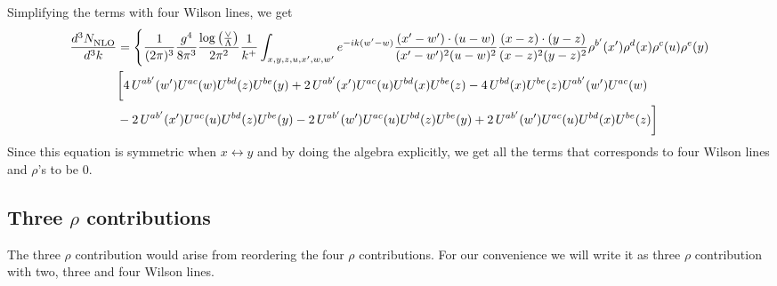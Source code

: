 \documentclass[aps,prd,amsmath,amssymb,nofootinbib]{revtex4-2}
\numberwithin{equation}{section}
\begin{document}
Simplifying the terms with four Wilson lines, we get
\begin{align}
       \frac{d^{3}N_{\rm NLO}^{\rm}}{d^{3}k}  & =  \Bigg\{\frac{1}{(2\pi)^{3}}\frac{g^{4}}{8\pi^{3}}\frac{\log{\left(\frac{\vee}{\Lambda}\right)}}{2\pi^{2}} \frac{1}{k^{+}}\int_{x,y,z,u,x^{\prime},w,w^{\prime}}e^{-ik(w^{\prime}-w)}\frac{(x^{\prime}-w^{\prime})\cdot (u-w)}{(x^{\prime}-w^{\prime})^{2} (u-w)^{2}} \frac{(x-z)\cdot (y-z)}{(x-z)^{2}(y-z)^{2}}\rho^{b'}(x') \rho^{d}(x) \rho^{c}(u) \rho^{e}(y)\notag \\ & \bigg[4\,U^{ab'}(w')U^{ac}(w)U^{bd}(z)U^{be}(y)+2\,U^{ab'}(x')U^{ac}(u)U^{bd}(x)U^{be}(z)-4\,U^{bd}(x)U^{be}(z)U^{ab'}(w')U^{ac}(w)\notag \\ & -2\,U^{ab'}(x')U^{ac}(u)U^{bd}(z)U^{be}(y)-2\,U^{ab'}(w')U^{ac}(u)U^{bd}(z)U^{be}(y)+2\,U^{ab'}(w')U^{ac}(u)U^{bd}(x)U^{be}(z)\bigg]
\end{align}
Since this equation is symmetric when $x\leftrightarrow y$ and by doing the algebra explicitly, we get all the terms that corresponds to four Wilson lines and $\rho$'s to be $0$.
\subsection{Three $\rho$ contributions }
The three $\rho$ contribution would arise from reordering the four $\rho$ contributions. For our convenience we will write it as three $\rho$ contribution with two, three and four Wilson lines. 
\end{document}
